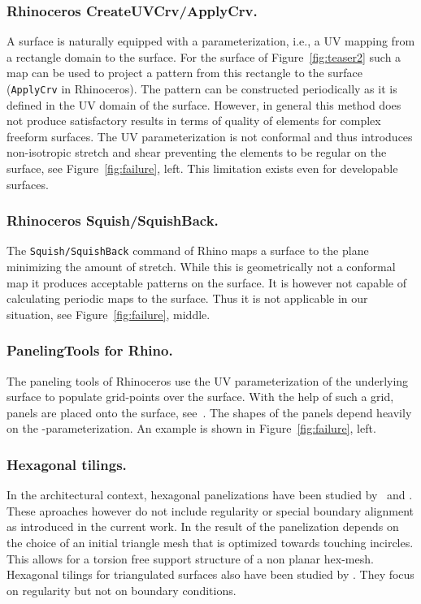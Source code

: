 \documentclass[Thesis.tex]{subfiles}
\begin{document}
\subsubsection{Rhinoceros CreateUVCrv/ApplyCrv.}
A \nurbs surface is naturally equipped with a parameterization, i.e.,
a UV mapping from a rectangle domain to the surface. For the surface
of Figure~\ref{fig:teaser2} such a map can be used to project a pattern
from this rectangle to the surface ({\tt ApplyCrv} in Rhinoceros). The
pattern can be constructed periodically as it is defined in the UV
domain of the surface. However, in general this method does not
produce satisfactory results in terms of quality of elements for
complex freeform surfaces. The UV parameterization is not conformal
and thus introduces non-isotropic stretch and shear preventing the
elements to be regular on the surface, see Figure~\ref{fig:failure},
left. This limitation exists even for developable surfaces.

\subsubsection{Rhinoceros Squish/SquishBack.}
The {\tt Squish/SquishBack} command of Rhino maps a surface to the
plane minimizing the amount of stretch. While this is geometrically
not a conformal map it produces acceptable patterns on the surface. It
is however not capable of calculating periodic maps to the surface.
Thus it is not applicable in our situation, see
Figure~\ref{fig:failure}, middle.

\subsubsection{PanelingTools for Rhino.}
The paneling tools of Rhinoceros use the UV parameterization of the
underlying surface to populate grid-points over the surface. With the
help of such a grid, panels are placed onto the surface,
see~\cite{panelingtools}. The shapes of the panels depend heavily on
the \nurbs-parameterization. An example is shown in
Figure~\ref{fig:failure}, left.

\subsubsection{Hexagonal tilings.}
In the architectural context, hexagonal panelizations have been
studied by~\cite{ZimmerCHK2013, Troche2008} and \cite{SchiftnerHWP2009}. These
aproaches however do not include regularity or special boundary
alignment as introduced in the current work.  In \cite{SchiftnerHWP2009} the
result of the panelization depends on the choice of an initial
triangle mesh that is optimized towards touching incircles. This
allows for a torsion free support structure of a non planar
hex-mesh. Hexagonal tilings for triangulated surfaces also have been
studied by \cite{NieserPPZ2012}. They focus on regularity but not on
boundary conditions.
\end{document}

